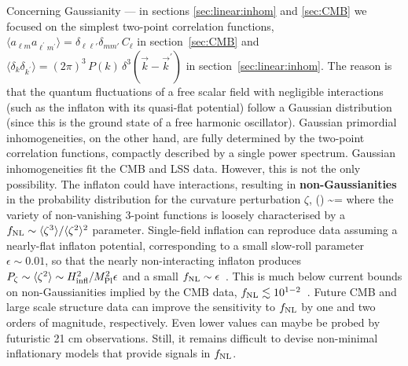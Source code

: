 Concerning Gaussianity --- in sections \ref{sec:linear:inhom} and \ref{sec:CMB} we  focused on the simplest two-point correlation functions, $\langle a_{\ell m} a_{\ell^\prime m^\prime} \rangle = \delta_{\ell\ell\prime} \delta_{mm\prime} \, C_\ell$ in section~\ref{sec:CMB} and $\langle \delta_k \delta_{k^\prime} \rangle = (2 \pi)^3 \, P(k) \, \delta^3(\vec k- \vec k^\prime)$ in section~\ref{sec:linear:inhom}. The reason is that the 
quantum fluctuations of a free scalar field with negligible interactions (such as the inflaton with its quasi-flat potential)
follow a Gaussian distribution (since this is the ground state of a free harmonic oscillator).
Gaussian primordial inhomogeneities, on the other hand, are fully determined by the two-point correlation functions,
compactly described by a single power spectrum.
Gaussian inhomogeneities fit the CMB and LSS data. However, this is not the only possibility. 
The inflaton could have interactions, resulting in {\bf non-Gaussianities} in the probability
distribution for the curvature perturbation $\zeta$,
\beq \wp (\zeta) \sim \exp {}=
\exp {}\eeq
where the variety of non-vanishing 3-point functions is loosely characterised by a
$f_{\rm NL} \sim \langle \zeta^3\rangle/\langle \zeta^2\rangle^2$ parameter.
Single-field inflation can reproduce data assuming a nearly-flat inflaton potential, corresponding to a small slow-roll parameter $\epsilon \sim 0.01$,
so that the nearly non-interacting inflaton produces $P_\zeta \sim \langle \zeta^2\rangle\sim H^2_{\rm infl}/M^2_{\rm Pl}\epsilon$ and a small $f_{\rm NL} \sim \epsilon$~\cite{1002.1416}.
This is much below current bounds on non-Gaussianities implied by the CMB data, $f_{\rm NL}\lesssim 10^{1-2}$~\cite{Planckresults}.
Future CMB and large scale structure data can improve the sensitivity to $f_{\rm NL}$ by one and two orders of magnitude, respectively.
Even lower values can maybe be probed by futuristic 21 cm observations.
Still, it remains difficult to devise non-minimal inflationary models that provide signals in $f_{\rm NL}$.




\smallskip

